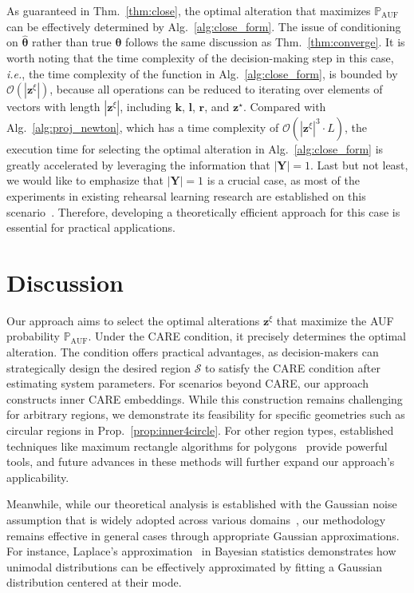 \documentclass{article}
\theoremstyle{plain}
\theoremstyle{definition}
\def \Y{\mathbf{Y}}
\def \ie {\textit{i.e.}}
\def \sS {\mathcal{S}}
\def \Y {\mathbf{Y}}
\def \k {\mathbf{k}}
\def \z {\mathbf{z}}
\begin{document}
As guaranteed in Thm.~\ref{thm:close}, the optimal alteration that maximizes \(\mathbb{P}_{\operatorname{AUF}}\) can be effectively determined by Alg.~\ref{alg:close_form}. The issue of conditioning on \(\hat{\bm{\theta}}\) rather than true \(\bm{\theta}\) follows the same discussion as Thm.~\ref{thm:converge}. 
It is worth noting that the time complexity of the decision-making step in this case, \ie, the time complexity of the function in Alg.~\ref{alg:close_form}, is bounded by \(\mathcal{O}(|\z^\xi|)\), because all operations can be reduced to iterating over elements of vectors with length \(|\z^\xi|\), including \(\k\), \(\bm{l}\), \(\bm{r}\), and \(\z^\star\). Compared with Alg.~\ref{alg:proj_newton}, which has a time complexity of \(\mathcal{O}(|\z^\xi|^3 \cdot L)\), the execution time for selecting the optimal alteration in Alg.~\ref{alg:close_form} is greatly accelerated by leveraging the information that \(|\Y| = 1\). Last but not least, we would like to emphasize that \(|\Y| = 1\) is a crucial case, as most of the experiments in existing rehearsal learning research are established on this scenario~\citep{qint2023srm,du2024micns}. Therefore, developing a theoretically efficient approach for this case is essential for practical applications.




\section{Discussion}
\label{sec:discuss}
Our approach aims to select the optimal alterations \(\z^\xi\) that maximize the AUF probability \(\mathbb{P}_{\operatorname{AUF}}\). 
Under the CARE condition, it precisely determines the optimal alteration. The condition offers practical advantages, as decision-makers can strategically design the desired region \(\sS\) to satisfy the CARE condition after estimating system parameters. For scenarios beyond CARE, our approach constructs inner CARE embeddings. While this construction remains challenging for arbitrary regions, we demonstrate its feasibility for specific geometries such as circular regions in Prop.~\ref{prop:inner4circle}. For other region types, established techniques like maximum rectangle algorithms for polygons~\citep{CHOI2021101710} provide powerful tools, and future advances in these methods will further expand our approach's applicability.

Meanwhile, while our theoretical analysis is established with the Gaussian noise assumption that is widely adopted across various domains~\citep{shumway2000time, cohen2018online}, our methodology remains effective in general cases through appropriate Gaussian approximations. For instance, Laplace's approximation~\citep{bishop2006pmlr} in Bayesian statistics demonstrates how unimodal distributions can be effectively approximated by fitting a Gaussian distribution centered at their mode.
\end{document}
